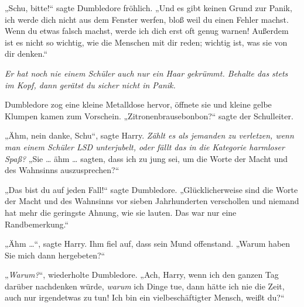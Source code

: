 „Schu, bitte!“ sagte Dumbledore fröhlich.
„Und es gibt keinen Grund zur Panik, ich werde dich nicht aus dem Fenster werfen, bloß weil du einen Fehler machst. Wenn du etwas falsch machst, werde ich dich erst oft genug warnen! Außerdem ist es nicht so wichtig, wie die Menschen mit dir reden; wichtig ist, was sie von dir denken.“

\emph{Er hat noch nie einem Schüler auch nur ein Haar gekrümmt. Behalte das stets im Kopf, dann gerätst du sicher nicht in Panik.}

Dumbledore zog eine kleine Metalldose hervor, öffnete sie und kleine gelbe Klumpen kamen zum Vorschein.
„Zitronenbrausebonbon?“ sagte der Schulleiter.

„Ähm, nein danke, Schu“, sagte Harry. \emph{Zählt es als jemanden zu verletzen, wenn man einem Schüler LSD unterjubelt, oder fällt das in die Kategorie harmloser Spaß?}
„Sie … ähm … sagten, dass ich zu jung sei, um die Worte der Macht und des Wahnsinns auszusprechen?“

„Das bist du auf jeden Fall!“ sagte Dumbledore.
„Glücklicherweise sind die Worte der Macht und des Wahnsinns vor sieben Jahrhunderten verschollen und niemand hat mehr die geringste Ahnung, wie sie lauten. Das war nur eine Randbemerkung.“

„Ähm …“, sagte Harry. Ihm fiel auf, dass sein Mund offenstand.
„Warum haben Sie mich dann hergebeten?“

„\emph{Warum?}“, wiederholte Dumbledore.
„Ach, Harry, wenn ich den ganzen Tag darüber nachdenken würde, \emph{warum} ich Dinge tue, dann hätte ich nie die Zeit, auch nur irgendetwas zu tun! Ich bin ein vielbeschäftigter Mensch, weißt du?“

